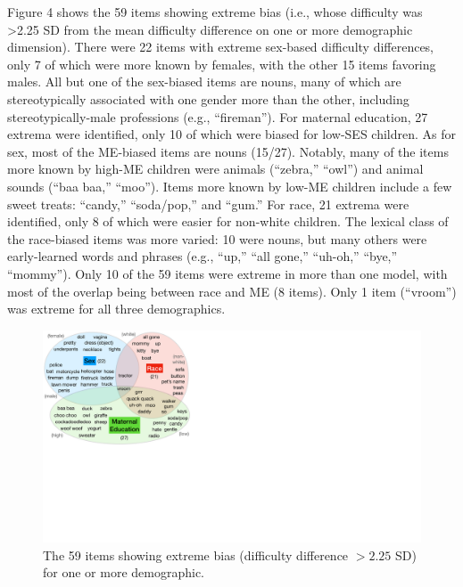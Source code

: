 \documentclass[10pt, letterpaper]{article}
\newenvironment{CodeChunk}{}{}
\begin{document}
Figure 4 shows the 59 items showing extreme bias (i.e., whose difficulty
was \textgreater2.25 SD from the mean difficulty difference on one or
more demographic dimension). There were 22 items with extreme sex-based
difficulty differences, only 7 of which were more known by females, with
the other 15 items favoring males. All but one of the sex-biased items
are nouns, many of which are stereotypically associated with one gender
more than the other, including stereotypically-male professions (e.g.,
``fireman''). For maternal education, 27 extrema were identified, only
10 of which were biased for low-SES children. As for sex, most of the
ME-biased items are nouns (15/27). Notably, many of the items more known
by high-ME children were animals (``zebra,'' ``owl'') and animal sounds
(``baa baa,'' ``moo''). Items more known by low-ME children include a
few sweet treats: ``candy,'' ``soda/pop,'' and ``gum.'' For race, 21
extrema were identified, only 8 of which were easier for non-white
children. The lexical class of the race-biased items was more varied: 10
were nouns, but many others were early-learned words and phrases (e.g.,
``up,'' ``all gone,'' ``uh-oh,'' ``bye,'' ``mommy''). Only 10 of the 59
items were extreme in more than one model, with most of the overlap
being between race and ME (8 items). Only 1 item (``vroom'') was extreme
for all three demographics.

\begin{CodeChunk}
\begin{figure}[H]

{\centering \includegraphics[width=\linewidth]{figs/extrema2p25sd} 

}

\caption[The 59 items showing extreme bias (difficulty difference $>2.25$ SD) for one or more demographic]{The 59 items showing extreme bias (difficulty difference $>2.25$ SD) for one or more demographic.}\label{fig:biased-words}
\end{figure}
\end{CodeChunk}
\end{document}
